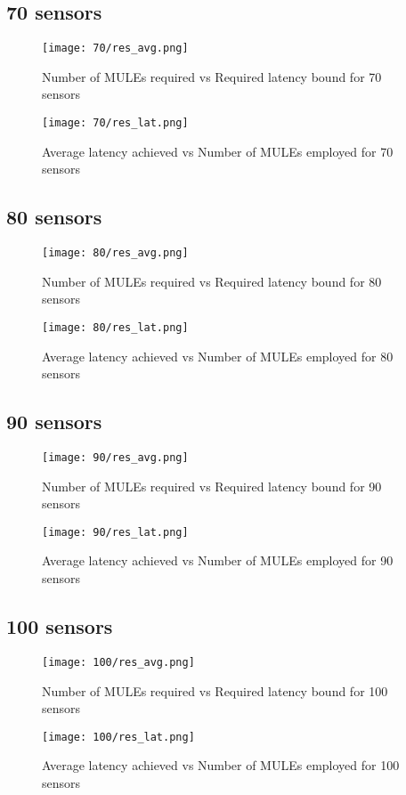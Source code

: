\subsection{70 sensors}
\begin{figure}[H]
\texttt{[image: 70/res\_avg.png]}
\caption{Number of MULEs required vs Required latency bound for 70 sensors}
\end{figure}
\begin{figure}[H]
\texttt{[image: 70/res\_lat.png]}
\caption{Average latency achieved vs Number of MULEs employed for 70 sensors}
\end{figure}

\subsection{80 sensors}
\begin{figure}[H]
\texttt{[image: 80/res\_avg.png]}
\caption{Number of MULEs required vs Required latency bound for 80 sensors}
\end{figure}
\begin{figure}[H]
\texttt{[image: 80/res\_lat.png]}
\caption{Average latency achieved vs Number of MULEs employed for 80 sensors}
\end{figure}

\subsection{90 sensors}
\begin{figure}[H]
\texttt{[image: 90/res\_avg.png]}
\caption{Number of MULEs required vs Required latency bound for 90 sensors}
\end{figure}
\begin{figure}[H]
\texttt{[image: 90/res\_lat.png]}
\caption{Average latency achieved vs Number of MULEs employed for 90 sensors}
\end{figure}

\subsection{100 sensors}
\begin{figure}[H]
\texttt{[image: 100/res\_avg.png]}
\caption{Number of MULEs required vs Required latency bound for 100 sensors}
\end{figure}
\begin{figure}[H]
\texttt{[image: 100/res\_lat.png]}
\caption{Average latency achieved vs Number of MULEs employed for 100 sensors}
\end{figure}
